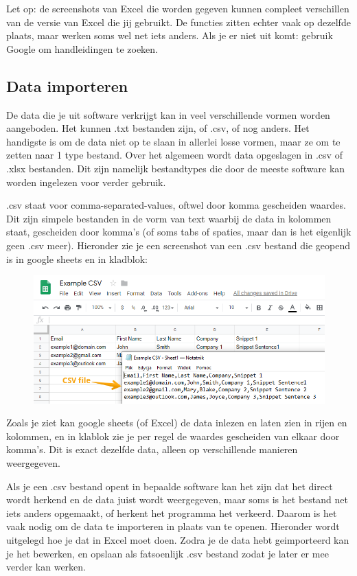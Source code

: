 Let op: de screenshots van Excel die worden gegeven kunnen compleet verschillen van de versie van Excel die jij gebruikt. De functies zitten echter vaak op dezelfde plaats, maar werken soms wel net iets anders. Als je er niet uit komt: gebruik Google om handleidingen te zoeken. 

\subsection{Data importeren}

De data die je uit software verkrijgt kan in veel verschillende vormen worden aangeboden. Het kunnen .txt bestanden zijn, of .csv, of nog anders. Het handigste is om de data niet op te slaan in allerlei losse vormen, maar ze om te zetten naar 1 type bestand. Over het algemeen wordt data opgeslagen in .csv of .xlsx bestanden. Dit zijn namelijk bestandtypes die door de meeste software kan worden ingelezen voor verder gebruik.

.csv staat voor comma-separated-values, oftwel door komma gescheiden waardes. Dit zijn simpele bestanden in de vorm van text waarbij de data in kolommen staat, gescheiden door komma's (of soms tabs of spaties, maar dan is het eigenlijk geen .csv meer). Hieronder zie je een screenshot van een .csv bestand die geopend is in google sheets en in kladblok:

\begin{figure}[h]
\begin{center}
\includegraphics[width=\textwidth]{img/csv_ex.png}
\end{center}
\end{figure}

Zoals je ziet kan google sheets (of Excel) de data inlezen en laten zien in rijen en kolommen, en in klablok zie je per regel de waardes gescheiden van elkaar door komma's. Dit is exact dezelfde data, alleen op verschillende manieren weergegeven. 

Als je een .csv bestand opent in bepaalde software kan het zijn dat het direct wordt herkend en de data juist wordt weergegeven, maar soms is het bestand net iets anders opgemaakt, of herkent het programma het verkeerd. Daarom is het vaak nodig om de data te importeren in plaats van te openen. Hieronder wordt uitgelegd hoe je dat in Excel moet doen. Zodra je de data hebt geimporteerd kan je het bewerken, en opslaan als fatsoenlijk .csv bestand zodat je later er mee verder kan werken.

